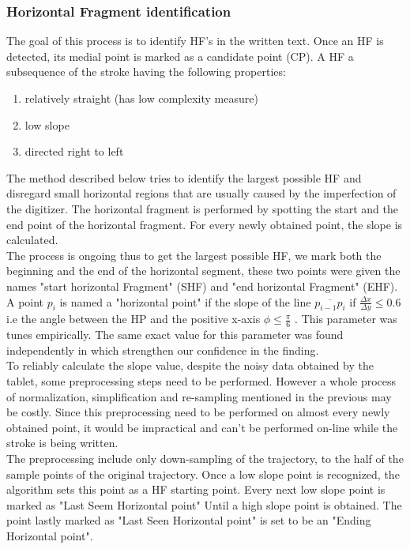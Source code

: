 \documentclass[journal,compsoc]{IEEEtran}
\begin{document}
\subsubsection{Horizontal Fragment identification}
The goal of this process is to identify HF's in the written text. Once an HF is detected, its medial point is marked as a candidate point (CP). A HF a subsequence of the stroke having the following properties: 
\begin{enumerate}
\item relatively straight (has low complexity measure)
\item low slope
\item directed right to left 
\end{enumerate}
The method described below tries to identify the largest possible HF and disregard small horizontal regions that are usually caused by the imperfection of the digitizer. The horizontal fragment is performed by spotting the start and the end point of the horizontal fragment. For every newly obtained point, the slope is calculated.\\

The process is ongoing thus to get the largest possible HF, we mark both the beginning and the end of the horizontal segment, these two points were given the names "start horizontal Fragment" (SHF) and "end horizontal Fragment" (EHF). 
A point $p_{i}$ is named a "horizontal point" if the slope of the line $\overline{p_{i-1}p_{i}}$ if $\frac{\Delta x}{\Delta y}\leq0.6$ i.e the angle between the HP and the positive x-axis $\phi \leq \frac{\pi}{6}$ . This parameter was tunes empirically. The same exact value for this parameter was found independently in \cite{daifallah2009recognition} which strengthen our confidence in the finding.\\
To reliably calculate the slope value, despite the noisy data obtained by the tablet, some preprocessing steps need to be performed. However a whole process of normalization, simplification and re-sampling mentioned in the previous may be costly. Since this preprocessing need to be performed on almost every newly obtained point, it would be impractical and can't be performed on-line while the stroke is being written.\\

The preprocessing include only down-sampling of the trajectory, to the half of the sample points of the original trajectory.
Once a low slope point is recognized, the algorithm sets this point as a HF starting point. Every next low slope point is marked as "Last Seem Horizontal point" Until a high slope point is obtained. The point lastly marked as "Last Seen Horizontal point" is set to be an "Ending Horizontal point".\\
\end{document}
